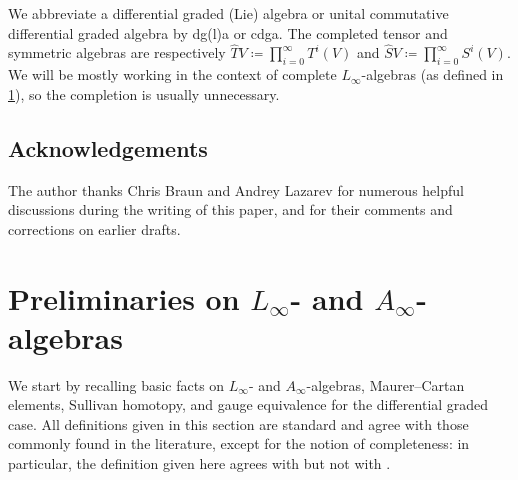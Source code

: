 \documentclass[a4paper,reqno]{amsart}
\theoremstyle{plain}
\theoremstyle{definition}
\theoremstyle{remark}
\begin{document}
We abbreviate a differential graded (Lie) algebra or unital commutative differential graded algebra by dg(l)a or cdga.
The completed tensor and symmetric algebras are respectively $\widehat{T}V
\coloneqq \prod_{i=0}^{\infty} T^i(V)$ and $\widehat{S}V \coloneqq \prod_{i=0}^{\infty} S^i(V) $.
We will be mostly working in the context of complete $L_{\infty}$-algebras (as defined in \cref{prelim}), so the completion is usually unnecessary.


\subsection*{Acknowledgements}
The author thanks Chris Braun and Andrey Lazarev for numerous helpful discussions during the writing of this paper, and for their comments and corrections on earlier drafts.


\section{Preliminaries on $L_{\infty}$- and $A_{\infty}$-algebras}
\label{prelim}

We start by recalling basic facts on $L_{\infty}$- and $A_{\infty}$-algebras, Maurer--Cartan elements, Sullivan homotopy, and gauge equivalence for the differential graded case.
All definitions given in this section are standard and agree with those commonly found in the literature, except for the notion of completeness: in particular, the definition given here agrees with \cite{lm15} but not with \cite{bfmt}.
\end{document}
